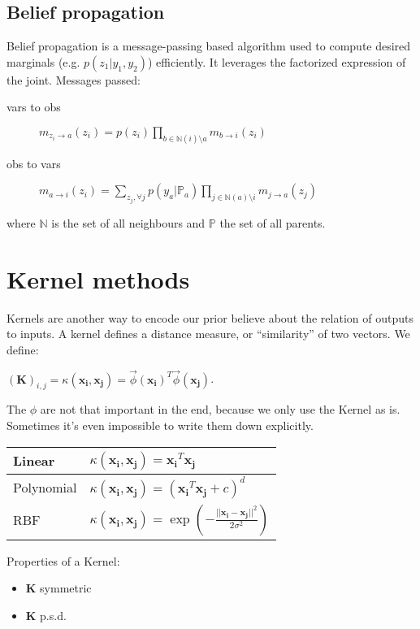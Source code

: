 \documentclass[10pt,a4paper,landscape]{article}
\renewcommand{\bf}[1]{\ensuremath{\mathbf{#1}}}
\newcommand{\psd}{p.s.d.}
\begin{document}
\begin{multicols*}{4}
\subsection{Belief propagation}
Belief propagation is a message-passing based algorithm used to compute desired marginals (e.g. $p(z_1 | y_1, y_2)$) efficiently. It leverages the factorized expression of the joint. Messages passed:
\begin{description}
\item[vars to obs]
$m_{z_i \rightarrow a}(z_i) = p(z_i) \prod_{b\in \mathbb{N}(i) 	\setminus a} m_{b\rightarrow i}(z_i)$
\item[obs to vars]
$m_{a \rightarrow i}(z_i) = \sum_{z_j,\forall j} p(y_a | \mathbb{P}_a) \prod_{j\in \mathbb{N}(a) \setminus i}m_{j\rightarrow a}(z_j)$
\end{description}
where $\mathbb{N}$ is the set of all neighbours and $\mathbb{P}$ the set of all parents.

\section{Kernel methods}
Kernels are another way to encode our prior believe about the relation of outputs to inputs. A kernel defines a distance measure, or ``similarity'' of two vectors. We define:

$(\bf{K})_{i,j} = \kappa(\bf{x_i}, \bf{x_j}) = \vec \phi(\bf{x_i})^T \vec \phi(\bf{x_j})$.

The $\phi$ are not that important in the end, because we only use the Kernel as is. Sometimes it's even impossible to write them down explicitly.

\begin{tabular}{ l | l }
  \hline
  Linear     & $\kappa(\bf{x_i}, \bf{x_j}) = \bf{x_i}^T \bf{x_j}$ \\
  \hline
  Polynomial & $\kappa(\bf{x_i}, \bf{x_j}) = (\bf{x_i}^T \bf{x_j} + c)^d$ \\
  \hline
  RBF        & $\kappa(\bf{x_i}, \bf{x_j}) = \exp\left(-\frac{||\bf{x_i} - \bf{x_j}||^2}{2\sigma^2}\right)$ \\
  \hline
\end{tabular}

Properties of a Kernel:
\begin{itemize}
\item $\bf{K}$ symmetric%
\item $\bf{K}$ \psd%
\end{itemize}


\end{multicols*}
\end{document}
